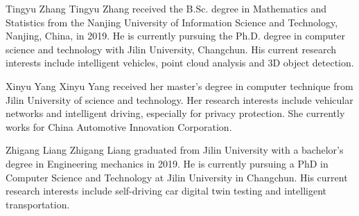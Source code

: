 \documentclass[journal]{IEEEtran}
\begin{document}
	
	\begin{IEEEbiography}{Tingyu Zhang}
		Tingyu Zhang received the B.Sc. degree in Mathematics and Statistics from the Nanjing University of Information Science and Technology, Nanjing, China,
		in 2019. He is currently pursuing the Ph.D. degree
		in computer science and technology with Jilin University,
		Changchun. His current research interests
		include intelligent vehicles, point cloud analysis and 3D object detection.\end{IEEEbiography}
	\begin{IEEEbiography}{Xinyu Yang}
	Xinyu Yang received her master's degree in computer technique from Jilin University of science and technology. Her research interests include vehicular networks and intelligent driving, especially for privacy protection. She currently works for China Automotive Innovation Corporation.\end{IEEEbiography}
	
	
	
	\begin{IEEEbiography}{Zhigang Liang}
		Zhigang Liang graduated from Jilin University with a bachelor's degree in Engineering mechanics in 2019. He is currently pursuing a PhD in Computer Science and Technology at Jilin University in Changchun. His current research interests include self-driving car digital twin testing and intelligent transportation.\end{IEEEbiography}
	
\end{document}

